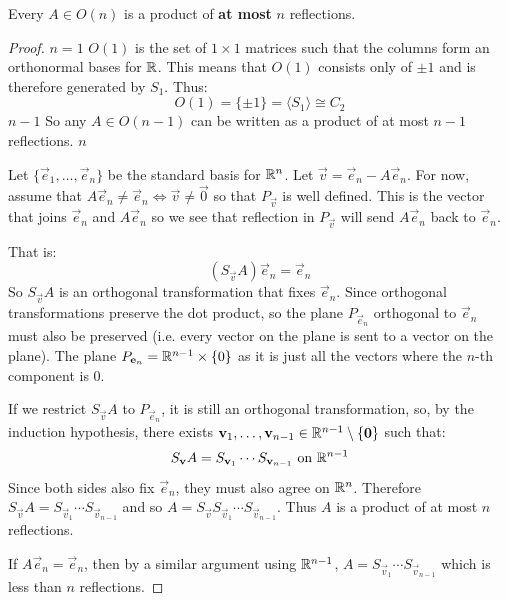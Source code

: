 \documentclass[../main.tex]{subfiles}
\begin{document}
\begin{theorem}
  Every $A \in O(n)$ is a product of \textbf{at most} $n$ reflections. \label{reflectionsGenerate}
\end{theorem}
\begin{proof}
  \induction
  {$n = 1$}{
    $O(1)$ is the set of $1 \times 1$ matrices such that the columns form an orthonormal bases for $\mathbb{R}$.
    This means that $O(1)$ consists only of $\pm 1$ and is therefore generated by $S_{1}$.
    Thus:
    \[
      O(1) = \{\pm 1\} = \langle S_1 \rangle \cong C_2
    \]
  }
  {$n - 1$}{
    So any $A \in O(n - 1)$ can be written as a product of at most $n - 1$ reflections.
  }
  {$n$}{
    Let $\{\vec{e}_1, \ldots, \vec{e}_n\}$ be the standard basis for $\mathbb{R}^{n}$.
    Let $\vec{v} = \vec{e}_n - A \vec{e}_n$.
    For now, assume that $A\vec{e}_n \neq \vec{e}_n \iff \vec{v} \neq \vec{0}$ so that $P_{\vec{v}}$ is well defined.
    This is the vector that joins $\vec{e}_n$ and $A\vec{e}_n$ so we see that reflection in $P_{\vec{v}}$ will send $A\vec{e}_n$ back to $\vec{e}_n$.
    \begin{center}
    \end{center}
    That is:
    \[
      (S_{\vec{v}}A)\vec{e}_n = \vec{e}_n
    \]
    So $S_{\vec{v}}A$ is an orthogonal transformation that fixes $\vec{e}_n$.
    Since orthogonal transformations preserve the dot product, so the plane $P_{\vec{e}_n}$ orthogonal to $\vec{e}_n$ must also be preserved (i.e. every vector on the plane is sent to a vector on the plane).
    The plane $P_{\mathbf{\bm{e}}_n} = \mathbb{R}^{n - 1} \times \{0\}$ as it is just all the vectors where the $n$-th component is 0.

    If we restrict $S_{\vec{v}}A$ to $P_{\vec{e}_n}$, it is still an orthogonal transformation, so, by the induction hypothesis, there exists $\mathbf{\bm{v}}_1, \ldots, \mathbf{\bm{v}}_{n - 1} \in \mathbb{R}^{n - 1} \setminus \{\mathbf{\bm{0}}\}$ such that:
    \[
      S_{\mathbf{\bm{v}}}A = S_{\mathbf{\bm{v}}_1} \cdots S_{\mathbf{\bm{v}}_{n - 1}} \text{ on }\mathbb{R}^{n - 1}
    \]
    Since both sides also fix $\vec{e}_n$, they must also agree on $\mathbb{R}^{n}$.
    Therefore $S_{\vec{v}}A = S_{\vec{v}_1} \cdots S_{\vec{v}_{n - 1}}$ and so $A = S_{\vec{v}} S_{\vec{v}_1} \cdots S_{\vec{v}_{n - 1}}$.
    Thus $A$ is a product of at most $n$ reflections.

    If $A\vec{e}_n = \vec{e}_n$, then by a similar argument using $\mathbb{R}^{n - 1}$, $A = S_{\vec{v}_1} \cdots S_{\vec{v}_{n - 1}}$ which is less than $n$ reflections.
  }
\end{proof}
\end{document}
